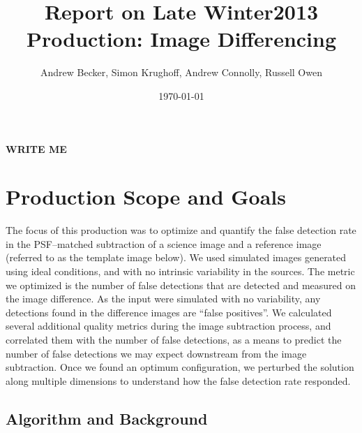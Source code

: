 \documentclass[prd, nofootinbib, floatfix, 11pt,tightenlines,times]{article}
\author{Andrew Becker, Simon Krughoff, Andrew Connolly, Russell Owen}
\title{Report on Late Winter2013 Production: Image Differencing}
\date{\today}
\begin{document}
\maketitle

{\bf WRITE ME}

\clearpage
\tableofcontents
\clearpage

\section{Production Scope and Goals}

The focus of this production was to optimize and quantify the false
detection rate in the PSF--matched subtraction of a science image and
a reference image (referred to as the template image below).  We used
simulated images generated using ideal conditions, and with no
intrinsic variability in the sources.  The metric we optimized is the
number of false detections that are detected and measured on the image
difference.  As the input were simulated with no variability, any
detections found in the difference images are ``false positives''.  We
calculated several additional quality metrics during the image
subtraction process, and correlated them with the number of false
detections, as a means to predict the number of false detections we
may expect downstream from the image subtraction.  Once we found an
optimum configuration, we perturbed the solution along multiple
dimensions to understand how the false detection rate responded.  

\subsection{Algorithm and Background}
\end{document}
